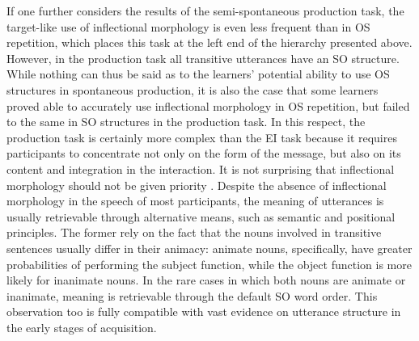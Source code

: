 If one further considers the results of the semi-spontaneous production task, the target-like use of inflectional morphology is even less frequent than in OS repetition, which places this task at the left end of the hierarchy presented above. However, in the production task all transitive utterances have an SO structure. While nothing can thus be said as to the learners’ potential ability to use OS structures in spontaneous production, it is also the case that some learners proved able to accurately use inflectional morphology in OS repetition, but failed to the same in SO structures in the production task. In this respect, the production task is certainly more complex than the EI task because it requires participants to concentrate not only on the form of the message, but also on its content and integration in the interaction. It is not surprising that inflectional morphology should not be given priority \citep{Klein2002}. Despite the absence of inflectional morphology in the speech of most participants, the meaning of utterances is usually retrievable through alternative means, such as semantic and positional principles. The former rely on the fact that the nouns involved in transitive sentences usually differ in their animacy: animate nouns, specifically, have greater probabilities of performing the subject function, while the object function is more likely for inanimate nouns. In the rare cases in which both nouns are animate or inanimate, meaning is retrievable through the default SO word order. This observation too is fully compatible with vast evidence on utterance structure in the early stages of acquisition.


